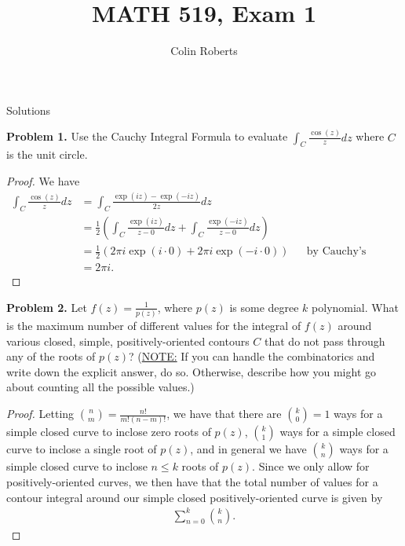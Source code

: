 \documentclass[leqno]{article}
\author{Colin Roberts}
\title{MATH 519, Exam 1}
\theoremstyle{nonumberplain}
\newtheorem{proof}{Proof}
\begin{document}
\maketitle
\begin{large}
\begin{center}
Solutions
\end{center}
\end{large}


\noindent\textbf{Problem 1.}  Use the Cauchy Integral Formula to evaluate $\int_C \frac{\cos(z)}{z}dz$ where $C$ is the unit circle.

\begin{proof}
We have 
\begin{align*}
\int_C \frac{\cos(z)}{z}dz &= \int_C \frac{\exp(iz)-\exp(-iz)}{2z}dz\\
&= \frac{1}{2} \left( \int_C \frac{\exp(iz)}{z-0}dz + \int_C \frac{\exp(-iz)}{z-0}dz \right)\\
&= \frac{1}{2} \left( 2\pi i \exp(i\cdot 0)+ 2\pi i \exp(-i\cdot 0)\right) &&\textrm{by Cauchy's Integral Formula}\\
&= 2\pi i.
\end{align*}
\end{proof}

\vspace*{1cm}


\noindent\textbf{Problem 2.} Let $f(z)=\frac{1}{p(z)}$, where $p(z)$ is some degree $k$ polynomial. What is the maximum number of different values for the integral of $f(z)$ around various closed, simple, positively-oriented contours $C$ that do not pass through any of the roots of $p(z)$? (\underline{NOTE:} If you can handle the combinatorics and write down the explicit answer, do so. Otherwise, describe how you might go about counting all the possible values.)

\begin{proof}
Letting ${n\choose m} = \frac{n!}{m!(n-m)!}$, we have that there are ${k\choose 0}=1$ ways for a simple closed curve to inclose zero roots of $p(z)$, ${k\choose 1}$ ways for a simple closed curve to inclose a single root of $p(z)$, and in general we have ${k\choose n}$ ways for a simple closed curve to inclose $n\leq k$ roots of $p(z)$. Since we only allow for positively-oriented curves, we then have that the total number of values for a contour integral around our simple closed positively-oriented curve is given by
\begin{align*}
\sum_{n=0}^k {k \choose n}.
\end{align*}
\end{proof}
\end{document}
